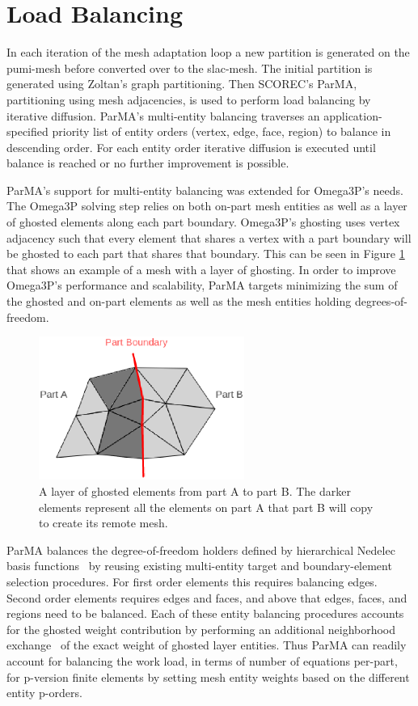 \documentclass[review,12pt]{elsarticle_summary_report}
\begin{document}
\section{\label{load_balance}Load Balancing}
In each iteration of the mesh adaptation loop a new partition is generated on the
pumi-mesh before converted over to the slac-mesh. The initial partition is generated
using Zoltan's graph partitioning. Then SCOREC's ParMA, partitioning using mesh adjacencies,
is used to perform load balancing by iterative diffusion. ParMA's multi-entity balancing
traverses an application-specified priority list of entity orders (vertex, edge, face,
region) to balance in descending order.
For each entity order iterative diffusion is executed until balance is reached
or no further improvement is possible.

ParMA's support for multi-entity balancing was extended for Omega3P's needs.
The Omega3P solving step relies on both on-part mesh entities as well as a layer
of ghosted elements along each part boundary.
Omega3P's ghosting uses vertex adjacency such that every element that shares a
vertex with a part boundary will be ghosted to each part that shares that
boundary.
This can be seen in Figure \ref{fig:ghost3} that shows an example of a mesh with
a layer of ghosting.
In order to improve Omega3P's performance and scalability, ParMA targets
minimizing the sum of the ghosted and on-part elements as well as the mesh
entities holding degrees-of-freedom.

\begin{figure}[ht]
\centering
\includegraphics[width=0.6\textwidth]{ghost.eps} 
\caption{\label{fig:ghost3} A layer of ghosted elements from part A to part B. The darker elements represent all the elements on part A that part B will copy to create its remote mesh.}
\end{figure}

ParMA balances the degree-of-freedom holders defined by 
hierarchical Nedelec basis functions~\cite{ko2010advances,ingelstrom2006new} by
reusing existing multi-entity target and boundary-element selection
procedures.
For first order elements this requires balancing edges.
Second order elements requires edges and faces, and above that edges, faces, and
regions need to be balanced.
Each of these entity balancing procedures accounts for the ghosted weight
contribution by performing an additional neighborhood
exchange~\cite{ibanez2014hybrid} of the exact weight of ghosted layer entities.
Thus ParMA can readily account for balancing the work load, in terms of number
of equations per-part, for p-version finite elements by setting mesh entity
weights based on the different entity p-orders.
\end{document}
